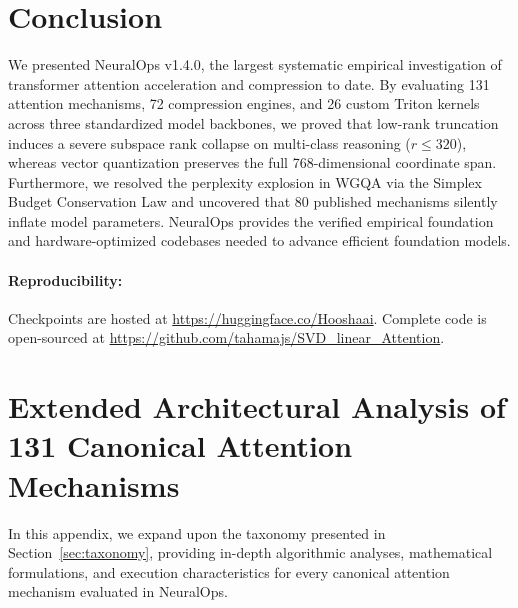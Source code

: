 \documentclass{article}
\begin{document}
\section{Conclusion}
\label{sec:conclusion}
We presented NeuralOps v1.4.0, the largest systematic empirical investigation of transformer attention acceleration and compression to date. By evaluating 131 attention mechanisms, 72 compression engines, and 26 custom Triton kernels across three standardized model backbones, we proved that low-rank truncation induces a severe subspace rank collapse on multi-class reasoning ($r \le 320$), whereas vector quantization preserves the full 768-dimensional coordinate span. Furthermore, we resolved the perplexity explosion in WGQA via the Simplex Budget Conservation Law and uncovered that 80 published mechanisms silently inflate model parameters. NeuralOps provides the verified empirical foundation and hardware-optimized codebases needed to advance efficient foundation models.

\paragraph{Reproducibility:} Checkpoints are hosted at \url{https://huggingface.co/Hooshaai}. Complete code is open-sourced at \url{https://github.com/tahamajs/SVD_linear_Attention}.




\clearpage
\appendix

\section{Extended Architectural Analysis of 131 Canonical Attention Mechanisms}
\label{app:extended_attentions}
In this appendix, we expand upon the taxonomy presented in Section~\ref{sec:taxonomy}, providing in-depth algorithmic analyses, mathematical formulations, and execution characteristics for every canonical attention mechanism evaluated in NeuralOps.
\end{document}
